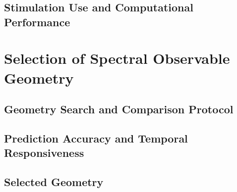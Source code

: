 \subsection{Stimulation Use and Computational Performance}

\section{Selection of Spectral Observable Geometry}

\subsection{Geometry Search and Comparison Protocol}

\subsection{Prediction Accuracy and Temporal Responsiveness}

\subsection{Selected Geometry}


